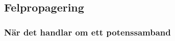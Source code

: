\documentclass[11pt,a4paper, english, swedish
]{article}
\begin{document}
\subsection{Felpropagering}


\subsubsection{När det handlar om ett potenssamband}


%
\end{document}

